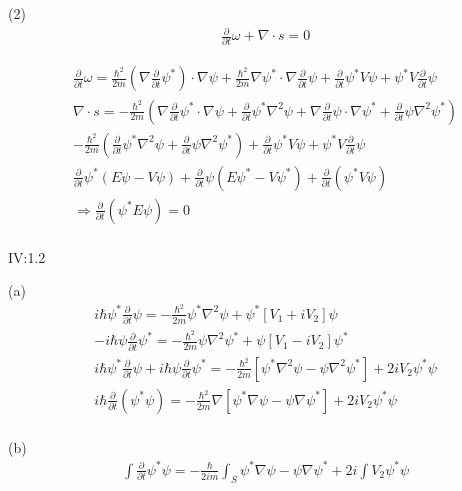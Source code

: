 \documentclass{article}
\begin{document}
  (2)\begin{align*}
  & \frac{ \partial }{ \partial t}\omega + \nabla \cdot s=0
  \end{align*}

  \begin{align*}
      & \frac{ \partial }{ \partial t}\omega=\frac{\hbar^2}{2m}(\nabla \frac{  \partial }{ \partial t}\psi^*)\cdot \nabla\psi+\frac{ \hbar^2}{2m}\nabla \psi^* \cdot \nabla \frac{ \partial }{ \partial t}\psi+\frac{ \partial }{ \partial t}\psi^*V\psi+\psi^*V\frac{ \partial }{ \partial t}\psi\\
      & \nabla\cdot s=-\frac{\hbar^2}{2m}(\nabla \frac{ \partial }{ \partial t}\psi^*\cdot \nabla\psi+\frac{ \partial }{ \partial t}\psi^* \nabla^2 \psi+\nabla\frac{ \partial }{ \partial t}\psi\cdot \nabla \psi^*+\frac{ \partial }{ \partial t}\psi \nabla^2 \psi^*) \\
      &-\frac{ \hbar^2}{2m}(\frac{ \partial }{ \partial t}\psi^*\nabla^2\psi+\frac{ \partial }{ \partial t}\psi\nabla^2 \psi^*)+\frac{ \partial }{ \partial t}\psi^*V\psi+\psi^*V\frac{ \partial }{ \partial t}\psi \\
      &\frac{ \partial }{ \partial t}\psi^*(E\psi-V\psi)+\frac{ \partial }{ \partial t}\psi(E\psi^*-V\psi^*) +\frac{ \partial }{ \partial t}(\psi^*V\psi)\\
      &\Rightarrow \frac{ \partial }{ \partial t}(\psi^*E\psi)=0 \\
  \end{align*}

  IV:1.2 

  (a)\begin{align*}
    &i\hbar \psi^* \frac{ \partial }{ \partial t}\psi=-\frac{\hbar^2}{2m}\psi^*\nabla^2\psi+\psi^*[V_1+iV_2]\psi\\
    & -i\hbar \psi\frac{ \partial }{ \partial t}\psi^*=-\frac{ \hbar^2}{2m}\psi\nabla^2 \psi^*+\psi[V_1-iV_2]\psi^* \\
    & i\hbar \psi^*\frac{ \partial }{ \partial t}\psi +i\hbar \psi\frac{ \partial }{ \partial t}\psi^* = -\frac{ \hbar^2}{2m}[\psi^*\nabla^2\psi-\psi\nabla^2\psi^*]+2iV_2\psi^*\psi\\
    &i\hbar \frac{ \partial }{ \partial t}(\psi^*\psi)=-\frac{ \hbar^2}{2m}\nabla[\psi^*\nabla\psi-\psi\nabla\psi^*]+2iV_2\psi^*\psi \\
  \end{align*}

  (b)\begin{align*}
  &\int \frac{ \partial }{ \partial t}\psi^*\psi=-\frac{ \hbar}{2im}\int_{S}\psi^*\nabla\psi-\psi\nabla\psi^*+2i\int V_2\psi^*\psi
  \end{align*}
\end{document}
